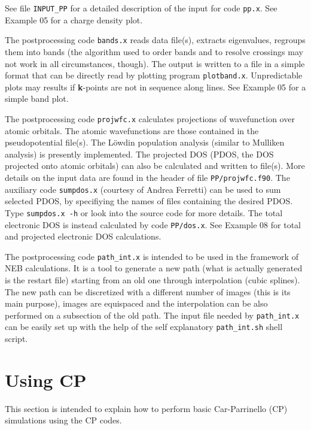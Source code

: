\documentclass[12pt,a4paper]{article}
\begin{document}
See file \texttt{INPUT\_PP} for a detailed description of the input
for code \texttt{pp.x}.
See Example 05 for a charge density plot.

The postprocessing code \texttt{bands.x} reads data file(s), extracts
eigenvalues, regroups them into bands (the algorithm used to order
bands and to resolve crossings may not work in all circumstances,
though).
The output is written to a file in a simple format that can be
directly read by plotting program \texttt{plotband.x}.
Unpredictable plots may results if \textbf{k}-points are not in
sequence along lines.
See Example 05 for a simple band plot.

The postprocessing code \texttt{projwfc.x} calculates projections of
wavefunction over atomic orbitals.
The atomic wavefunctions are those contained in the pseudopotential
file(s).
The L\"owdin population analysis (similar to Mulliken analysis) is
presently implemented.
The projected DOS (PDOS, the DOS projected onto atomic orbitals) can 
also be calculated and written to file(s).
More details on the input data are found in the header of file
\texttt{PP/projwfc.f90}. The auxiliary code \texttt{sumpdos.x}
(courtesy of Andrea Ferretti) can be used to sum selected PDOS, 
by specifiying the names of files containing the desired PDOS.
Type \texttt{sumpdos.x -h} or look into the source code for
more details.
The total electronic DOS is instead calculated by code
\texttt{PP/dos.x}.
See Example 08 for total and projected electronic DOS calculations.

The postprocessing code \texttt{path\_int.x} is intended to be used in
the framework of NEB calculations.
It is a tool to generate a new path (what is actually generated is the
restart file) starting from an old one through interpolation (cubic
splines).
The new path can be discretized with a different number of images
(this is its main purpose), images are equispaced and the
interpolation can be also performed on a subsection of the old path.
The input file needed by \texttt{path\_int.x} can be easily set up
with the help of the self explanatory \texttt{path\_int.sh} shell
script.

\clearpage

\section{Using CP}

This section is intended to explain how to perform basic
Car-Parrinello (CP) simulations using the CP codes.
\end{document}
